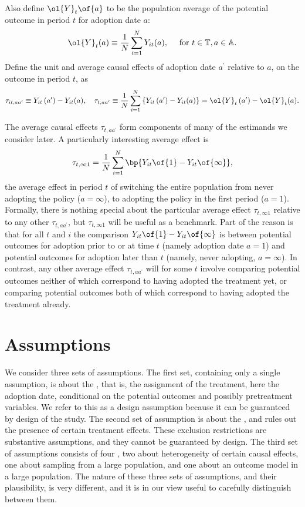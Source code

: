 \documentclass[12pt]{article}
\newcommand{\highlightB}[1]{{\emph{\color{MyBlue}{#1}}}}
\theoremstyle{definition}
\begin{document}
Also define $\ol{Y}_t\of{a}$ to be the population average of the potential outcome in period $t$ for adoption date $a$:
$$
\ol{Y}_t(a) \equiv \frac{1}{N} \sum_{i=1}^N Y_{i t}(a), \quad \text { for } t \in \mathbb{T}, a \in \mathbb{A}.
$$
Define the unit and average causal effects of adoption date $a^\prime$ relative to $a$, on the outcome in period $t$, as 
$$
\tau_{i t, a a^{\prime}} \equiv Y_{i t}\left(a^{\prime}\right)-Y_{i t}(a), \quad \tau_{t, a a^{\prime}} \equiv \frac{1}{N} \sum_{i=1}^N\left\{Y_{i t}\left(a^{\prime}\right)-Y_{i t}(a)\right\}=\ol{Y}_t\left(a^{\prime}\right)-\ol{Y}_t(a) .
$$

The average causal effects $\tau_{t, a a^\prime}$ form components of many of the estimands we consider later. A particularly interesting average effect is 
\begin{equation}
    \notag 
    \tau_{t, \infty 1} = \frac{1}{N} \sum_{i=1}^{N} \bp{Y_{it}\of{1} - Y_{it}\of{\infty}},
\end{equation}
the average effect in period $t$ of switching the entire population from never adopting the policy ($a = \infty$), to adopting the policy in the first period ($a = 1$). Formally, there is nothing special about the particular average effect $\tau_{t, \infty 1}$ relative to any other $\tau_{t, a a^\prime}$, but $\tau_{t, \infty 1}$ will be useful as a benchmark. Part of the reason is that for all $t$ and $i$ the comparison $Y_{it}\of{1} - Y_{it}\of{\infty}$ is between potential outcomes for adoption prior to or at time $t$ (namely adoption date $a = 1$) and potential outcomes for adoption later than $t$ (namely, never adopting, $a = \infty$). In contrast, any other average effect $\tau_{t, a a^\prime}$ will for some $t$ involve comparing potential outcomes neither of which correspond to having adopted the treatment yet, or comparing potential outcomes both of which correspond to having adopted the treatment already.

\section{Assumptions}

We consider three sets of assumptions. The first set, containing only a single assumption, is about the \highlightB{design}, that is, the assignment of the treatment, here the adoption date, conditional on the potential outcomes and possibly pretreatment variables. We refer to this as a design assumption because it can be guaranteed by design of the study. The second set of assumption is about the \highlightB{potential outcomes}, and rules out the presence of certain treatment effects. These exclusion restrictions are substantive assumptions, and they cannot be guaranteed by design. The third set of assumptions consists of four \highlightB{auxiliary assumptions}, two about heterogeneity of certain causal effects, one about sampling from a large population, and one about an outcome model in a large population. The nature of these three sets of assumptions, and their plausibility, is very different, and it is in our view useful to carefully distinguish between them.
\end{document}
